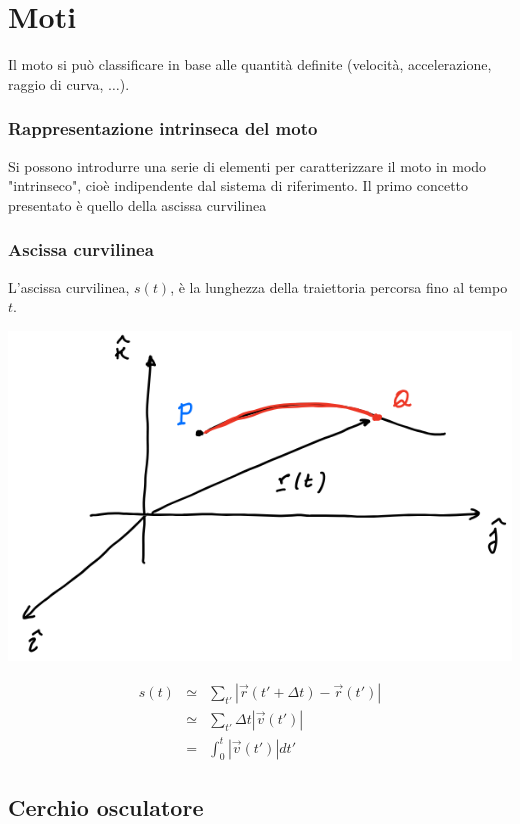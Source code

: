 \documentclass{article}
\begin{document}
\section{Moti}

Il moto si può classificare in base alle quantità definite (velocità, accelerazione, raggio di curva, $\dots$).

\subsubsection{Rappresentazione intrinseca del moto}

Si possono introdurre una serie di elementi per caratterizzare il moto in modo "intrinseco", cioè indipendente dal sistema di riferimento. Il primo concetto presentato è quello della ascissa curvilinea

\subsubsection{Ascissa curvilinea}

L'ascissa curvilinea, $s(t)$, è la lunghezza della traiettoria percorsa fino al tempo $t$.

\includegraphics[width=\columnwidth]{ascissa-curvilinea}

$$
\begin{matrix}
s(t) &\simeq& \sum_{t'} |\vec{r}(t' + \Delta t) - \vec{r}(t')| \\
&\simeq& \sum_{t'} \Delta t |\vec{v}(t')| \\
&=& \int^{t}_{0}{|\vec{v}(t')| dt'}
\end{matrix}
$$

\subsection{Cerchio osculatore}
\end{document}
